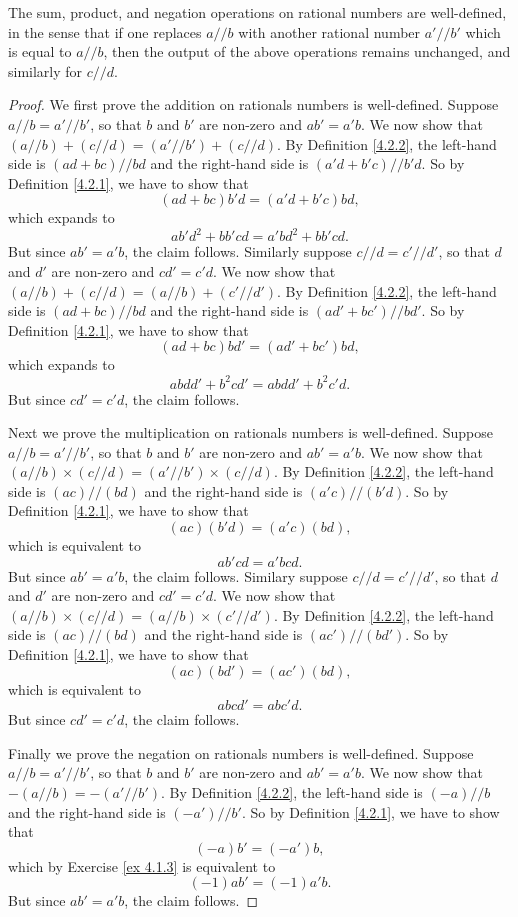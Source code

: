 \begin{lemma}\label{4.2.3}
The sum, product, and negation operations on rational numbers are well-defined, in the sense that if one replaces \(a // b\) with another rational number \(a' // b'\) which is equal to \(a // b\), then the output of the above operations remains unchanged, and similarly for \(c // d\).
\end{lemma}

\begin{proof}
We first prove the addition on rationals numbers is well-defined.
Suppose \(a // b = a' // b'\), so that \(b\) and \(b'\) are non-zero and \(ab' = a'b\).
We now show that \((a // b) + (c // d) = (a' // b') + (c // d)\).
By Definition \ref{4.2.2}, the left-hand side is \((ad + bc) // bd\) and the right-hand side is \((a'd + b'c) // b'd\).
So by Definition \ref{4.2.1}, we have to show that
\[
    (ad + bc)b'd = (a'd + b'c)bd,
\]
which expands to
\[
    ab'd^2 + bb'cd = a'bd^2 + bb'cd.
\]
But since \(ab' = a'b\), the claim follows.
Similarly suppose \(c // d = c' // d'\), so that \(d\) and \(d'\) are non-zero and \(cd' = c'd\).
We now show that \((a // b) + (c // d) = (a // b) + (c' // d')\).
By Definition \ref{4.2.2}, the left-hand side is \((ad + bc) // bd\) and the right-hand side is \((ad' + bc') // bd'\).
So by Definition \ref{4.2.1}, we have to show that
\[
    (ad + bc)bd' = (ad' + bc')bd,
\]
which expands to
\[
    abdd' + b^2cd' = abdd' + b^2c'd.
\]
But since \(cd' = c'd\), the claim follows.

Next we prove the multiplication on rationals numbers is well-defined.
Suppose \(a // b = a' // b'\), so that \(b\) and \(b'\) are non-zero and \(ab' = a'b\).
We now show that \((a // b) \times (c // d) = (a' // b') \times (c // d)\).
By Definition \ref{4.2.2}, the left-hand side is \((ac) // (bd)\) and the right-hand side is \((a'c) // (b'd)\).
So by Definition \ref{4.2.1}, we have to show that
\[
    (ac)(b'd) = (a'c)(bd),
\]
which is equivalent to
\[
    ab'cd = a'bcd.
\]
But since \(ab' = a'b\), the claim follows.
Similary suppose \(c // d = c' // d'\), so that \(d\) and \(d'\) are non-zero and \(cd' = c'd\).
We now show that \((a // b) \times (c // d) = (a // b) \times (c' // d')\).
By Definition \ref{4.2.2}, the left-hand side is \((ac) // (bd)\) and the right-hand side is \((ac') // (bd')\).
So by Definition \ref{4.2.1}, we have to show that
\[
    (ac)(bd') = (ac')(bd),
\]
which is equivalent to
\[
    abcd' = abc'd.
\]
But since \(cd' = c'd\), the claim follows.

Finally we prove the negation on rationals numbers is well-defined.
Suppose \(a // b = a' // b'\), so that \(b\) and \(b'\) are non-zero and \(ab' = a'b\).
We now show that \(-(a // b) = -(a' // b')\).
By Definition \ref{4.2.2}, the left-hand side is \((-a) // b\) and the right-hand side is \((-a') // b'\).
So by Definition \ref{4.2.1}, we have to show that
\[
    (-a)b' = (-a')b,
\]
which by Exercise \ref{ex 4.1.3} is equivalent to
\[
    (-1)ab' = (-1)a'b.
\]
But since \(ab' = a'b\), the claim follows.
\end{proof}

